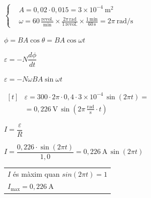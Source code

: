\begin{solapartat}
$\left\{\begin{aligned}
&A = 0,02\cdot 0,015 = 3\times 10^{-4}\ \mathrm{m^2}\\
&\omega = 60\,\frac{\text{revol.}}{\text{min}}\times\frac{2\pi\,\mathrm{rad}}{1\,\text{revol.}}\times\frac{1\,\text{min}}{60\,\mathrm{s}} = 2\pi\ \mathrm{rad/s}
\end{aligned}\right.$

\medskip
{} $\phi = BA\cos\theta = BA\cos\omega t$

\medskip
{} $\varepsilon = -N\dfrac{d\phi}{dt}$

\medskip
{} $\varepsilon = -N\omega BA\sin\omega t$

\medskip
$\begin{aligned}[t]
&\varepsilon = 300\cdot 2\pi\cdot 0,4\cdot 3\times 10^{-4}\,\sin(2\pi t) =\\
&= 0,226\ \mathrm{V}\,\sin\left(2\pi\,\frac{\mathrm{rad}}{\mathrm{s}}\cdot t\right)
\end{aligned}$
\end{solapartat}

\begin{solapartat}
 $I = \dfrac{\varepsilon}{R}$

\medskip
{} $I = \dfrac{0,226\cdot\sin(2\pi t)}{1,0} = 0,226\ \mathrm{A}\,\sin(2\pi t)$

\medskip
{}
\begin{tabular}[t]{@{}l@{}}
$I$ és màxim quan $\mathit{sin}(2\pi t) = 1$\\
$I_{\max} = 0,226\ \mathrm{A}$
\end{tabular}
\end{solapartat}
